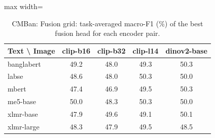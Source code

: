 \begin{table}[t]
\centering
\small
\caption{CMBan: Fusion grid: task-averaged macro-F1 (\%) of the best fusion head for each encoder pair.}
\label{tab:grid_coarse_cmban}
\begin{adjustbox}{max width=\columnwidth}
\begin{tabular}{lcccc}
\toprule
Text \textbackslash{} Image & clip-b16 & clip-b32 & clip-l14 & dinov2-base \\
\midrule
banglabert & 49.2 & 48.0 & 49.3 & 50.3 \\
labse & 48.6 & 48.0 & 50.3 & 50.0 \\
mbert & 47.4 & 46.9 & 49.5 & 50.3 \\
me5-base & 50.0 & 48.3 & 50.3 & 50.0 \\
xlmr-base & 47.9 & 49.6 & 49.1 & 50.1 \\
xlmr-large & 48.3 & 47.9 & 49.5 & 48.5 \\
\bottomrule
\end{tabular}
\end{adjustbox}
\end{table}
